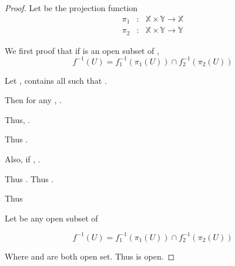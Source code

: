 \begin{proof}
      Let  be the projection function
      \begin{eqnarray*}
            \pi_{1}&:& \mathbb{X}\times\mathbb{Y} \rightarrow \mathbb{X} \\
            \pi_{2}&:& \mathbb{X}\times\mathbb{Y} \rightarrow \mathbb{Y}
      \end{eqnarray*}

      \vspace{1em}

      We first proof that if  is an open subset of ,
      \begin{equation*}
            f^{-1}(U) = f_{1}^{-1}(\pi_{1}(U)) \cap f_{2}^{-1}(\pi_{2}(U))
      \end{equation*}

      Let ,  contains all  such that .

      Then for any , .

      Thus, .

      Thus .

      \vspace{1em}

      Also, if , .

      Thus .
      Thus .

      Thus 

      \vspace{1em}

      Let  be any open subset of 

      \begin{equation*}
            f^{-1}(U) = f_{1}^{-1}(\pi_{1}(U)) \cap f_{2}^{-1}(\pi_{2}(U))
      \end{equation*}

      Where  and  are both open set. Thus  is open.
\end{proof}